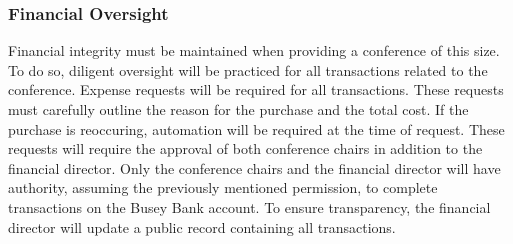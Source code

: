 \subsubsection{Financial Oversight}
Financial integrity must be maintained when providing a conference of this size. To do so, diligent oversight will be practiced for all transactions related to the conference. Expense requests will be required for all transactions. These requests must carefully outline the reason for the purchase and the total cost. If the purchase is reoccuring, automation will be required at the time of request. These requests will require the approval of both conference chairs in addition to the financial director. Only the conference chairs and the financial director will have authority, assuming the previously mentioned permission, to complete transactions on the Busey Bank account. To ensure transparency, the financial director will update a public record containing all transactions. 
